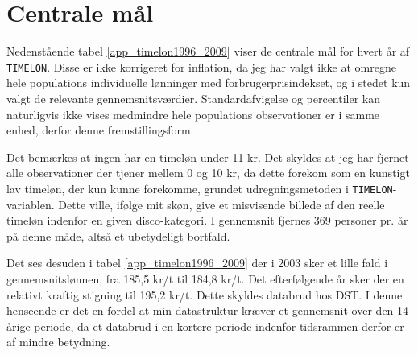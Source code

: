 \section{Centrale mål \label{}}

Nedenstående tabel \ref{app_timelon1996_2009} viser de centrale mål for hvert år af \texttt{TIMELON}. Disse er ikke korrigeret for inflation, da jeg har valgt ikke at omregne hele populations individuelle lønninger med forbrugerprisindekset, og i stedet kun valgt de relevante gennemsnitsværdier. Standardafvigelse og percentiler kan naturligvis ikke vises medmindre hele populations observationer er i samme enhed, derfor denne fremstillingsform. 

Det bemærkes at ingen har en timeløn under 11 kr. Det skyldes at jeg har fjernet alle observationer der tjener mellem 0 og 10 kr, da dette forekom som en kunstigt lav timeløn, der kun kunne forekomme, grundet udregningsmetoden i \texttt{TIMELON}-variablen. Dette ville, ifølge mit skøn, give et misvisende billede af den reelle timeløn indenfor en given disco-kategori. I gennemsnit fjernes 369 personer pr. år på denne måde, altså et ubetydeligt bortfald. 

Det ses desuden i tabel \ref{app_timelon1996_2009} der i 2003 sker et lille fald i gennemsnitslønnen, fra 185,5 kr/t til 184,8 kr/t. Det efterfølgende år sker der en relativt kraftig stigning til 195,2 kr/t. Dette skyldes databrud hos DST. I denne henseende er det en fordel at min datastruktur kræver et gennemsnit over den 14-årige periode, da et databrud i en kortere periode indenfor tidsrammen derfor er af mindre betydning. 

